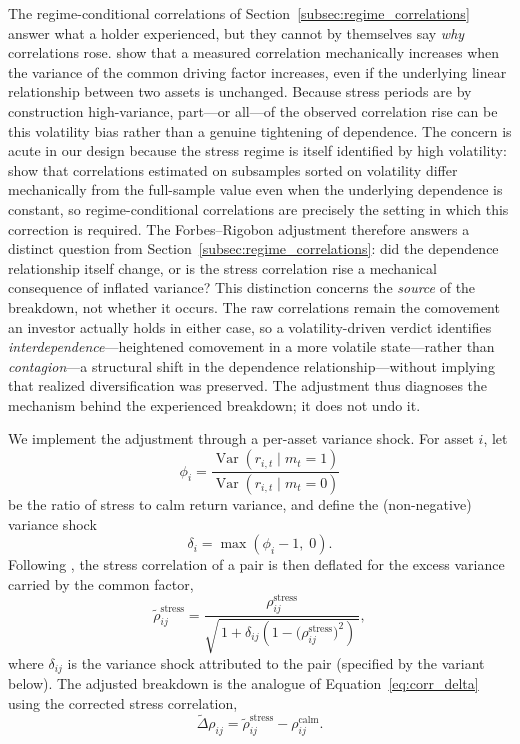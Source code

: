 The regime-conditional correlations of Section~\ref{subsec:regime_correlations} answer what a holder experienced, but they cannot by themselves say \emph{why} correlations rose. \citet{forbesrigobon2002} show that a measured correlation mechanically increases when the variance of the common driving factor increases, even if the underlying linear relationship between two assets is unchanged. Because stress periods are by construction high-variance, part---or all---of the observed correlation rise can be this volatility bias rather than a genuine tightening of dependence. The concern is acute in our design because the stress regime is itself identified by high volatility: \citet{boyer1999pitfalls} show that correlations estimated on subsamples sorted on volatility differ mechanically from the full-sample value even when the underlying dependence is constant, so regime-conditional correlations are precisely the setting in which this correction is required. The Forbes--Rigobon adjustment therefore answers a distinct question from Section~\ref{subsec:regime_correlations}: did the dependence relationship itself change, or is the stress correlation rise a mechanical consequence of inflated variance? This distinction concerns the \emph{source} of the breakdown, not whether it occurs. The raw correlations remain the comovement an investor actually holds in either case, so a volatility-driven verdict identifies \emph{interdependence}---heightened comovement in a more volatile state---rather than \emph{contagion}---a structural shift in the dependence relationship---without implying that realized diversification was preserved. The adjustment thus diagnoses the mechanism behind the experienced breakdown; it does not undo it.

We implement the adjustment through a per-asset variance shock. For asset $i$, let
\begin{equation}
\phi_i = \frac{\operatorname{Var}\!\left(r_{i,t} \mid m_t = 1\right)}{\operatorname{Var}\!\left(r_{i,t} \mid m_t = 0\right)}
\label{eq:var_ratio}
\end{equation}
be the ratio of stress to calm return variance, and define the (non-negative) variance shock
\begin{equation}
\delta_i = \max\!\left(\phi_i - 1,\; 0\right).
\label{eq:fr_delta}
\end{equation}
Following \citet{forbesrigobon2002}, the stress correlation of a pair is then deflated for the excess variance carried by the common factor,
\begin{equation}
\tilde{\rho}^{\mathrm{stress}}_{ij}
= \frac{\rho^{\mathrm{stress}}_{ij}}
{\sqrt{\,1 + \delta_{ij}\left(1 - \big(\rho^{\mathrm{stress}}_{ij}\big)^{2}\right)\,}},
\label{eq:fr_adjustment}
\end{equation}
where $\delta_{ij}$ is the variance shock attributed to the pair (specified by the variant below). The adjusted breakdown is the analogue of Equation~\eqref{eq:corr_delta} using the corrected stress correlation,
\begin{equation}
\tilde{\Delta}\rho_{ij} = \tilde{\rho}^{\mathrm{stress}}_{ij} - \rho^{\mathrm{calm}}_{ij}.
\label{eq:fr_delta_corr}
\end{equation}

